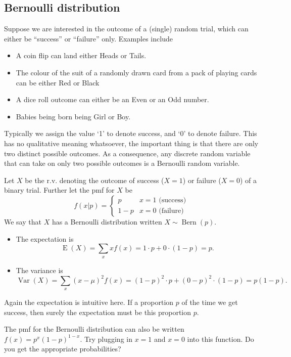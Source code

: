 \documentclass[
]{book}
\providecommand{\tightlist}{%
  \setlength{\itemsep}{0pt}\setlength{\parskip}{0pt}}
\DeclareMathOperator{\E}{E}
\DeclareMathOperator{\Var}{Var}
\DeclareMathOperator{\Bern}{Bern}
\theoremstyle{definition}
\theoremstyle{definition}
\theoremstyle{definition}
\theoremstyle{definition}
\theoremstyle{remark}
\begin{document}
\hypertarget{bernoulli-distribution}{%
\subsection{Bernoulli distribution}\label{bernoulli-distribution}}

Suppose we are interested in the outcome of a (single) random trial, which can either be {``success''} or {``failure''} only. Examples include

\begin{itemize}
\tightlist
\item
  A coin flip can land either {Heads} or {Tails}.
\item
  The colour of the suit of a randomly drawn card from a pack of playing cards can be either {Red} or {Black}
\item
  A dice roll outcome can either be an {Even} or an {Odd} number.
\item
  Babies being born being {Girl} or {Boy}.
\end{itemize}

Typically we assign the value `1' to denote success, and `0' to denote failure.
This has no qualitative meaning whatsoever, the important thing is that there are only two distinct possible outcomes.
As a consequence, any discrete random variable that can take on only two possible outcomes is a Bernoulli random variable.

Let \(X\) be the r.v. denoting the outcome of success (\(X=1\)) or failure (\(X=0\)) of a binary trial.
Further let the pmf for \(X\) be
\[
f(x|p) = \begin{cases}
p & x=1\text{ (success)}\\
1-p &x=0 \text{ (failure)}
\end{cases}
\]
We say that \(X\) has a Bernoulli distribution written \(X\sim\Bern(p)\).

\begin{itemize}
\tightlist
\item
  The expectation is
  \[
  \E(X) = \sum_x xf(x) = 1\cdot p + 0 \cdot (1-p) = p.
  \]
\item
  The variance is
  \[
  \Var(X) = \sum_x (x-\mu)^2f(x) = (1-p)^2\cdot p + (0-p)^2 \cdot (1-p) = p(1-p).
  \]
\end{itemize}

Again the expectation is intuitive here.
If a proportion \(p\) of the time we get success, then surely the expectation must be this proportion \(p\).

The pmf for the Bernoulli distribution can also be written \(f(x)=p^x(1-p)^{1-x}\).
Try plugging in \(x=1\) and \(x=0\) into this function.
Do you get the appropriate probabilities?
\end{document}
